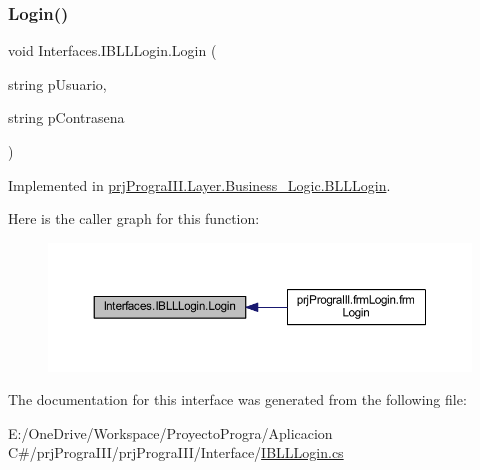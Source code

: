 \subsubsection{\texorpdfstring{Login()}{Login()}}
{\footnotesize\ttfamily void Interfaces.\+I\+B\+L\+L\+Login.\+Login (\begin{DoxyParamCaption}\item[{string}]{p\+Usuario,  }\item[{string}]{p\+Contrasena }\end{DoxyParamCaption})}



Implemented in \hyperlink{classprj_progra_i_i_i_1_1_layer_1_1_business___logic_1_1_b_l_l_login_a1ce2aab6695b99e4befd53e315168ade}{prj\+Progra\+I\+I\+I.\+Layer.\+Business\+\_\+\+Logic.\+B\+L\+L\+Login}.

Here is the caller graph for this function\+:
\nopagebreak
\begin{figure}[H]
\begin{center}
\leavevmode
\includegraphics[width=350pt]{interface_interfaces_1_1_i_b_l_l_login_a809da754cba4a38c15fd18a7bd9cb95a_icgraph}
\end{center}
\end{figure}


The documentation for this interface was generated from the following file\+:\begin{DoxyCompactItemize}
\item 
E\+:/\+One\+Drive/\+Workspace/\+Proyecto\+Progra/\+Aplicacion C\#/prj\+Progra\+I\+I\+I/prj\+Progra\+I\+I\+I/\+Interface/\hyperlink{_i_b_l_l_login_8cs}{I\+B\+L\+L\+Login.\+cs}\end{DoxyCompactItemize}
